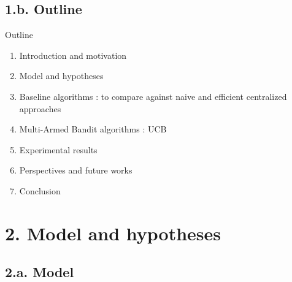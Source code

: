 \documentclass[12pt,english,ignorenonframetext,aspectratio=169,]{beamer}
\providecommand{\tightlist}{%
  \setlength{\itemsep}{0pt}\setlength{\parskip}{0pt}}
\begin{document}
\subsection{\hfill{}1.b. Outline\hfill{}}

\begin{frame}{Outline}

\begin{enumerate}
\def\labelenumi{\arabic{enumi}.}
\tightlist
\item
  Introduction and motivation
\item
  Model and hypotheses
\item
  Baseline algorithms : to compare against naive and efficient
  centralized approaches
\item
  Multi-Armed Bandit algorithms : UCB
\item
  Experimental results
\item
  Perspectives and future works
\item
  Conclusion
\end{enumerate}

\end{frame}



\section{\hfill{}2. Model and hypotheses\hfill{}}

\subsection{\hfill{}2.a. Model\hfill{}}
\end{document}
